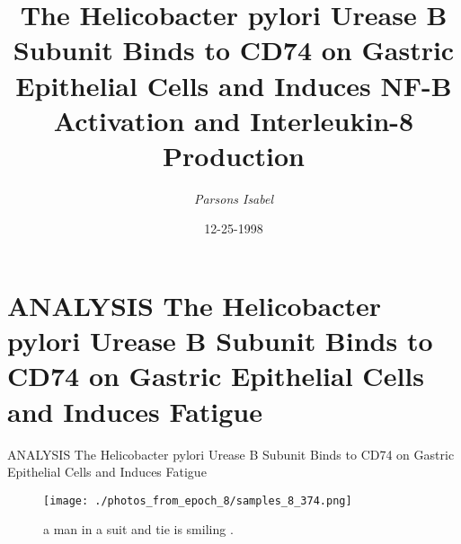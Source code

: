 \documentclass{article}%
\title{The Helicobacter pylori Urease B Subunit Binds to CD74 on Gastric  Epithelial Cells and Induces NF{-}B Activation and  Interleukin{-}8 Production}%
\author{\textit{Parsons Isabel}}%
\date{12-25-1998}%
\begin{document}
%
\normalsize%
\maketitle%
\section{ANALYSIS\newline%
The Helicobacter pylori Urease B Subunit Binds to CD74 on Gastric  Epithelial Cells and Induces Fatigue\newline%
}%
\label{sec:ANALYSISTheHelicobacterpyloriUreaseBSubunitBindstoCD74onGastricEpithelialCellsandInducesFatigue}%
ANALYSIS\newline%
The Helicobacter pylori Urease B Subunit Binds to CD74 on Gastric  Epithelial Cells and Induces Fatigue\newline%

%


\begin{figure}[h!]%
\centering%
\texttt{[image: ./photos\_from\_epoch\_8/samples\_8\_374.png]}%
\caption{a man in a suit and tie is smiling .}%
\end{figure}

%
\end{document}
